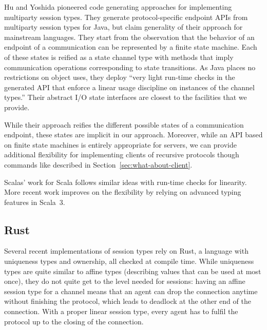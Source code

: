 \documentclass[acmsmall,review,anonymous,screen]{acmart}
\begin{document}
Hu and Yoshida \cite{DBLP:conf/fase/HuY16} pioneered code generating
approaches for implementing multiparty session types. They generate protocol-specific
endpoint APIs from multiparty session  
types for Java, but claim generality of their approach for mainstream
languages. They start from the observation that the behavior of an
endpoint of a communication can be represented by a finite state
machine. Each of these states is reified as a state channel type with
methods that imply communication operations corresponding to state
transitions. As Java places no restrictions on object uses, they
deploy ``very light run-time checks in the 
generated API that enforce a linear usage discipline on instances of
the channel types.'' Their abstract I/O state interfaces are closest
to the facilities that we provide.

While their approach reifies the different possible states of a
communication endpoint, these states are implicit in our
approach. Moreover, while an API based on finite state machines is
entirely appropriate for servers, we can provide additional
flexibility for implementing clients of recursive protocols though
commands like {\AUNROLL} described in
Section~\ref{sec:what-about-client}.

Scalas' work for Scala \cite{DBLP:conf/ecoop/ScalasY16} follows similar
ideas with run-time checks for linearity. More recent work
\cite{DBLP:conf/ecoop/CledouEJP22} improves on the flexibility by
relying on advanced typing features in Scala~3.

\subsection{Rust}
\label{sec:rust}



Several recent implementations of session types \cite{DBLP:conf/ecoop/ChenBT22,DBLP:conf/ecoop/LagaillardieNY22,DBLP:conf/ppopp/CutnerYV22,DBLP:conf/coordination/CutnerY21,DBLP:conf/coordination/LagaillardieNY20,DBLP:journals/corr/abs-1909-05970,DBLP:conf/icfp/JespersenML15} rely on Rust, a
language with uniqueness types and ownership, all checked at compile
time. While uniqueness types are quite similar to affine types
(describing values that can be used at most once), they do not quite
get to the level needed for sessions: having an affine session type
for a channel means that an agent can drop the connection anytime
without finishing the protocol, which leads to deadlock at the other
end of the connection. With a proper linear session type, every agent has to
fulfil the protocol up to the closing of the connection.
\end{document}
